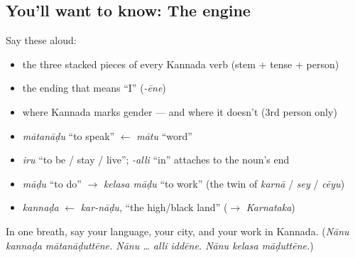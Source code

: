 \subsection*{You'll want to know: The engine}
Say these aloud:

\begin{itemize}
\raggedright
  \item the three stacked pieces of every Kannada verb (stem + tense + person)
  \item the ending that means \textquotedblleft{}I\textquotedblright{} (\emph{-ēne})
  \item where Kannada marks gender — and where it doesn't (3rd person only)
\end{itemize}

\begin{cousinweb}
\begin{itemize}
\raggedright
  \item \emph{mātanāḍu} \textquotedblleft{}to speak\textquotedblright{} $\leftarrow$ \emph{mātu} \textquotedblleft{}word\textquotedblright{}
  \item \emph{iru} \textquotedblleft{}to be / stay / live\textquotedblright{}; \emph{-alli} \textquotedblleft{}in\textquotedblright{} attaches to the noun's end
  \item \emph{māḍu} \textquotedblleft{}to do\textquotedblright{} $\to$ \emph{kelasa māḍu} \textquotedblleft{}to work\textquotedblright{} (the twin of \emph{karnā} / \emph{sey} / \emph{cēyu})
  \item \emph{kannaḍa} $\leftarrow$ \emph{kar-nāḍu}, \textquotedblleft{}the high/black land\textquotedblright{} ($\to$ \emph{Karnataka})
\end{itemize}
\end{cousinweb}

\begin{tcolorbox}[breakable,colback=teal!4,colframe=teal!35!black,title={Before you move on}]
In one breath, say your language, your city, and your work in Kannada. (\emph{Nānu kannaḍa mātanāḍuttēne. Nānu … alli iddēne. Nānu kelasa māḍuttēne.})
\end{tcolorbox}
